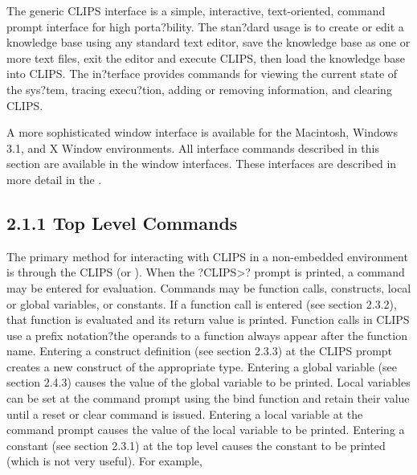\documentclass[letterpaper,10pt,english]{sphinxmanual}
\begin{document}
The generic CLIPS interface is a simple, interactive, text-oriented,
command prompt interface for high porta?bility. The stan?dard usage is
to create or edit a knowledge base using any standard text editor, save
the knowledge base as one or more text files, exit the editor and
execute CLIPS, then load the knowledge base into CLIPS. The in?terface
provides commands for viewing the current state of the sys?tem, tracing
execu?tion, adding or removing information, and clearing CLIPS.

A more sophisticated window interface is available for the Macintosh,
Windows 3.1, and X Window environments. All interface commands described
in this section are available in the window interfaces. These interfaces
are described in more detail in the .


\subsection{2.1.1 Top Level Commands}
\label{\detokenize{overview:top-level-commands}}
The primary method for interacting with CLIPS in a non-embedded
environment is through the CLIPS  (or ).
When the ?CLIPS\textgreater{}? prompt is printed, a command may be entered for
evaluation. Commands may be function calls, constructs, local or global
variables, or constants. If a function call is entered (see section
2.3.2), that function is evaluated and its return value is printed.
Function calls in CLIPS use a prefix notation?the operands to a function
always appear after the function name. Entering a construct definition
(see section 2.3.3) at the CLIPS prompt creates a new construct of the
appropriate type. Entering a global variable (see section 2.4.3) causes
the value of the global variable to be printed. Local variables can be
set at the command prompt using the bind function and retain their value
until a reset or clear command is issued. Entering a local variable at
the command prompt causes the value of the local variable to be printed.
Entering a constant (see section 2.3.1) at the top level causes the
constant to be printed (which is not very useful). For example,
\end{document}
